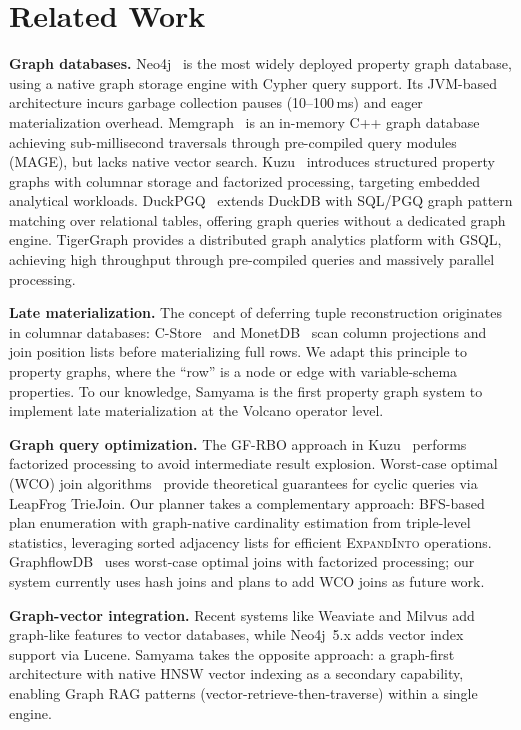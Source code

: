 \documentclass[sigconf, nonacm]{acmart}
\begin{document}
\section{Related Work}
\label{sec:related}

\textbf{Graph databases.}
Neo4j~\cite{neo4j2023} is the most widely deployed property graph database, using a native graph storage engine with Cypher query support.
Its JVM-based architecture incurs garbage collection pauses (10--100\,ms) and eager materialization overhead.
Memgraph~\cite{memgraph2023} is an in-memory C++ graph database achieving sub-millisecond traversals through pre-compiled query modules (MAGE), but lacks native vector search.
Kuzu~\cite{kuzu2023} introduces structured property graphs with columnar storage and factorized processing, targeting embedded analytical workloads.
DuckPGQ~\cite{duckpgq2023} extends DuckDB with SQL/PGQ graph pattern matching over relational tables, offering graph queries without a dedicated graph engine.
TigerGraph provides a distributed graph analytics platform with GSQL, achieving high throughput through pre-compiled queries and massively parallel processing.

\textbf{Late materialization.}
The concept of deferring tuple reconstruction originates in columnar databases: C-Store~\cite{abadi2008column} and MonetDB~\cite{boncz2005monetdb} scan column projections and join position lists before materializing full rows.
We adapt this principle to property graphs, where the ``row'' is a node or edge with variable-schema properties.
To our knowledge, Samyama is the first property graph system to implement late materialization at the Volcano operator level.

\textbf{Graph query optimization.}
The GF-RBO approach in Kuzu~\cite{kuzu2023} performs factorized processing to avoid intermediate result explosion.
Worst-case optimal (WCO) join algorithms~\cite{ngo2018wco} provide theoretical guarantees for cyclic queries via LeapFrog TrieJoin.
Our planner takes a complementary approach: BFS-based plan enumeration with graph-native cardinality estimation from triple-level statistics, leveraging sorted adjacency lists for efficient \textsc{ExpandInto} operations.
GraphflowDB~\cite{graphflowdb2023} uses worst-case optimal joins with factorized processing; our system currently uses hash joins and plans to add WCO joins as future work.

\textbf{Graph-vector integration.}
Recent systems like Weaviate and Milvus add graph-like features to vector databases, while Neo4j~5.x adds vector index support via Lucene.
Samyama takes the opposite approach: a graph-first architecture with native HNSW vector indexing as a secondary capability, enabling Graph RAG patterns (vector-retrieve-then-traverse) within a single engine.
\end{document}
